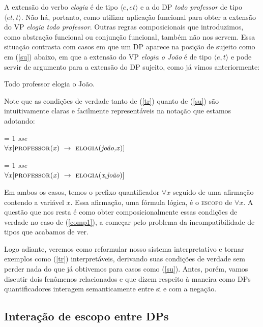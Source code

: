 \n A extensão do verbo \textit{elogia} é de tipo $\langle
e,et\rangle$ e a do DP \textit{todo professor} de tipo $\langle
et,t\rangle$. Não há, portanto, como utilizar aplicação funcional
para obter a extensão do VP \textit{elogia todo professor}.
Outras regras composicionais que introduzimos, como
abstração funcional ou conjunção funcional,
também não nos servem. Essa situação contrasta com casos em que um
DP aparece na posição de sujeito como em (\ref{su}) abaixo, em que
a extensão do VP \textit{elogia o João} é de tipo $\langle e,t\rangle$ e pode servir de argumento para a extensão do DP
sujeito, como já vimos anteriormente:

\begin{exe}
    \ex Todo professor elogia o João. \label{su}
\end{exe}

\n Note que as condições de verdade tanto de (\ref{tr}) quanto de (\ref{su}) são intuitivamente claras e facilmente representáveis na notação que estamos adotando:

\begin{exe}

\ex {} = 1 \textit{sse} \\
$\forall x [ \predica{professor}{x}\ \rightarrow\ \predica{elogia}{joão,x}]$ \label{comp1}

\ex {} = 1 \textit{sse} \\
$\forall x [\predica{professor}{x}\ \rightarrow\ \predica{elogia}{x,joão}]$ \label{comp2}

\end{exe}

\n Em ambos os casos, temos o prefixo quantificador $\forall x$ seguido de uma afirmação contendo a variável $x$. Essa afirmação, uma fórmula lógica, é o \textsc{escopo} de $\forall x$. A questão que nos resta é como obter composicionalmente essas condições de verdade no caso de (\ref{comp1}), a começar pelo problema da incompatibilidade de tipos que acabamos de ver.

Logo adiante, veremos como reformular nosso sistema interpretativo e tornar exemplos como (\ref{tr}) interpretáveis, derivando suas condições de verdade sem perder nada do que já obtivemos para casos como (\ref{su}). Antes, porém, vamos discutir dois fenômenos relacionados e que dizem respeito à maneira como DPs quantificadores interagem semanticamente entre si e com a negação.


\subsection{Interação de escopo entre DPs}


